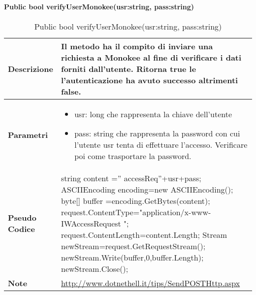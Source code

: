 \paragraph{Public bool verifyUserMonokee(usr:string, pass:string)}
\begin{center}
    \begin{longtable}{|p{3cm}|p{9cm}|}%
    \caption{Public bool verifyUserMonokee(usr:string, pass:string)}
    \label{tab:public-bool-verifyUserMonokeeImpl}
    \endfirsthead
    \endhead
    \hline
    \textbf{Descrizione} & Il metodo ha il compito di inviare una richiesta a Monokee al fine di verificare i dati forniti dall’utente. Ritorna true le l’autenticazione ha avuto successo altrimenti false.  \\
    \hline
    \textbf{Parametri} &      
        \begin{itemize}
            \item usr: long che rappresenta la chiave dell’utente
            \item pass: string che rappresenta la password con cui l’utente usr tenta di effettuare l’accesso. Verificare poi come trasportare la password.
        \end{itemize}
    \\
    \hline
    \textbf{Pseudo Codice} & 
    string content =” accessReq”+usr+pass; \newline
    ASCIIEncoding encoding=new ASCIIEncoding(); \newline
    byte[]  buffer =encoding.GetBytes(content); \newline
    request.ContentType="application/x-www-IWAccessRequest "; \newline
    request.ContentLength=content.Length; \newline
    Stream newStream=request.GetRequestStream(); \newline
    newStream.Write(buffer,0,buffer.Length); \newline
    newStream.Close();
    \\
    \hline
    \textbf{Note} & \url{http://www.dotnethell.it/tips/SendPOSTHttp.aspx} \\
    \hline
    \end{longtable}
    \end{center}


